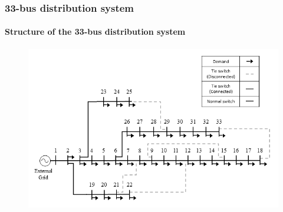 \documentclass[
	11pt, %
	aspectratio=169, %
]{beamer}
\begin{document}
\begin{frame}
	\frametitle{33-bus distribution system}
	\framesubtitle{Structure of the 33-bus distribution system}

	\begin{figure}
		\includegraphics[width=4 in,keepaspectratio]{modified_33_bus_disc.png}
	\end{figure}

	
\end{frame}

\end{document}
